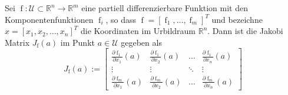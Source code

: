 Sei $\operatorname{f} : \mathcal{U} \subset \mathbb{R}^n \to \mathbb{R}^m$ eine partiell differenzierbare Funktion mit den Komponentenfunktionen $\operatorname{f}_i$, so dass $\operatorname{f} = [\operatorname{f}_1, \dots, \operatorname{f}_m]^T$ und bezeichne $x = \left[ x_1, x_2, \dots, x_n \right]^T$ die Koordinaten im Urbildraum $\mathbb{R}^n$. Dann ist die Jakobi Matrix $J_{\operatorname{f}}(a)$ im Punkt $a \in \mathcal{U}$ gegeben als
$$J_{\operatorname{f}}(a) :=  \begin{bmatrix}
	\frac{\partial \operatorname{f}_1}{\partial x_1}(a) & \frac{\partial \operatorname{f}_1}{\partial x_2}(a) & \ldots & \frac{\partial \operatorname{f}_1}{\partial x_n}(a) \\
	\vdots & \vdots & \ddots & \vdots \\
	\frac{\partial \operatorname{f}_m}{\partial x_1}(a) & \frac{\partial \operatorname{f}_m}{\partial x_2}(a) & \ldots & \frac{\partial \operatorname{f}_m}{\partial x_n} (a)
\end{bmatrix}$$

